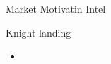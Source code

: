 %
\begin{Frame}{Market Motivatin Intel}
      \begin{block}{Knight landing}
        \begin{itemize}
        \item 
        \end{itemize}
      \end{block} 
\end{Frame}


